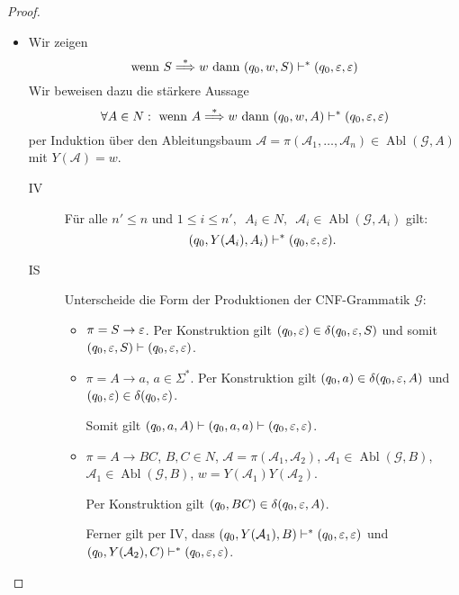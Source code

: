 \begin{proof}
\begin{itemize}
  \begin{itemize}
  \item Wir zeigen
    \begin{displaymath}
      \text{wenn } S \stackrel{*}{\Longrightarrow} w \text{ dann } (q_0, w, S) \vdash^* (q_0, \varepsilon, \varepsilon)
    \end{displaymath}
    Wir beweisen dazu die stärkere Aussage
    \begin{displaymath}
      \forall A \in N: \text{ wenn } A \stackrel{*}{\Longrightarrow} w\text{ dann } (q_0, w, A) \vdash^* (q_0, \varepsilon, \varepsilon)
    \end{displaymath}
    per Induktion über den Ableitungsbaum $\mathcal{A} = \pi(\mathcal{A}_1, \ldots, \mathcal{A}_n)\in \operatorname{Abl}(\mathcal{G}, A)$ mit $Y(\mathcal{A}) = w$.
    \begin{description}
    \item[IV] Für alle $n' \le n$ und $1 \le i \le n',\enspace A_i \in N,\enspace \mathcal{A}_i \in \operatorname{Abl}(\mathcal{G}, A_i)$ gilt:
      \begin{displaymath}
      (q_0, Y(\mathcal{A}_i), A_i) \vdash^* (q_0, \varepsilon, \varepsilon).
    \end{displaymath}
    \item[IS] Unterscheide die Form der Produktionen der CNF-Grammatik $\mathcal{G}$:
      \begin{itemize}
      \item $\pi = S \to \varepsilon$.
        Per Konstruktion gilt $(q_0, \varepsilon) \in \delta(q_0, \varepsilon, S)$ und somit $(q_0, \varepsilon, S) \vdash (q_0, \varepsilon, \varepsilon)$.
      \item $\pi = A \to a$, $a \in \Sigma^*$.
        Per Konstruktion gilt $(q_0, a) \in \delta(q_0, \varepsilon, A)$ und $(q_0, \varepsilon) \in \delta(q_0, \varepsilon)$.

        Somit gilt $(q_0, a, A) \vdash (q_0, a, a) \vdash (q_0, \varepsilon, \varepsilon)$.
      \item $\pi = A \to BC$, $B,C \in N$, $\mathcal{A} = \pi(\mathcal{A}_1, \mathcal{A}_2)$, $\mathcal{A}_1 \in \operatorname{Abl}(\mathcal{G}, B)$, $\mathcal{A}_1 \in \operatorname{Abl}(\mathcal{G}, B)$, $w = Y(\mathcal{A}_1)Y(\mathcal{A}_2)$.

        Per Konstruktion gilt $(q_0, BC) \in \delta(q_0, \varepsilon, A)$. 

        Ferner gilt per IV, dass $(q_0, Y(\mathcal{A}_1), B) \vdash^* (q_0, \varepsilon, \varepsilon)$ und $(q_0, Y(\mathcal{A}_2), C) \vdash^* (q_0, \varepsilon, \varepsilon)$.


\end{itemize}
\end{description}
\end{itemize}
\end{itemize}
\end{proof}
